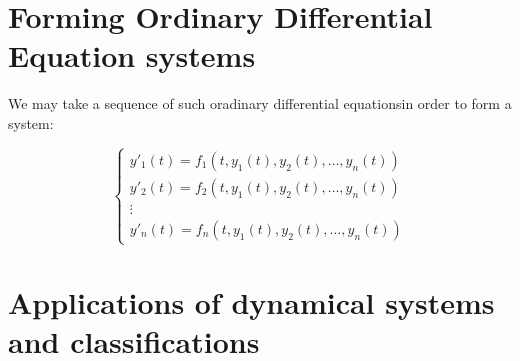 \section{Forming Ordinary Differential Equation systems}
We may take a sequence of such oradinary differential equationsin order to form a system:

\begin{equation}
    \begin{cases}
        y'_1(t) = f_1(t,y_1(t),y_2(t),\dots,y_n(t)) \\
        y'_2(t) = f_2(t,y_1(t),y_2(t),\dots,y_n(t)) \\
        \vdots                                      \\
        y'_n(t) = f_n(t,y_1(t),y_2(t),\dots,y_n(t))
    \end{cases}
\end{equation}



\section{Applications of dynamical systems and classifications}

